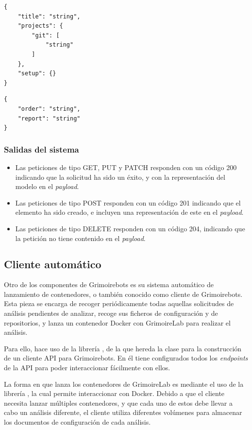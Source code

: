 \begin{lstlisting}
{
    "title": "string",
    "projects": {
        "git": [
            "string"
        ]
    },
    "setup": {}
}
\end{lstlisting}

\begin{lstlisting}
{
    "order": "string",
    "report": "string"
}
\end{lstlisting}

\subsubsection{Salidas del sistema}

\begin{itemize}
    \item Las peticiones de tipo GET, PUT y PATCH responden con un código 200 indicando que la solicitud ha sido un éxito, y con la representación del modelo en el \emph{payload}.
    \item Las peticiones de tipo POST responden con un código 201 indicando que el elemento ha sido creado, e incluyen una representación de este en el \emph{payload}.
    \item Las peticiones de tipo DELETE responden con un código 204, indicando que la petición no tiene contenido en el \emph{payload}.
\end{itemize}

\subsection{Cliente automático}

Otro de los componentes de Grimoirebots es su sistema automático de lanzamiento de contenedores, o también conocido como cliente de Grimoirebots. Esta pieza se encarga de recoger periódicamente todas aquellas solicitudes de análisis pendientes de analizar, recoge sus ficheros de configuración y de repositorios, y lanza un contenedor Docker con GrimoireLab para realizar el análisis.

Para ello, hace uso de la librería , de la que hereda la clase  para la construcción de un cliente API para Grimoirebots. En él tiene configurados todos los \emph{endpoints} de la API para poder interaccionar fácilmente con ellos.

La forma en que lanza los contenedores de GrimoireLab es mediante el uso de la librería , la cual permite interaccionar con Docker. Debido a que el cliente necesita lanzar múltiples contenedores, y que cada uno de estos debe llevar a cabo un análisis diferente, el cliente utiliza diferentes volúmenes para almacenar los documentos de configuración de cada análisis.

